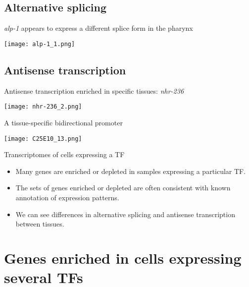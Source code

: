 \documentclass[serif,9pt]{beamer}
\begin{document}
\subsection{Alternative splicing}

\begin{frame}{{\em alp-1} appears to express a different splice form in the pharynx}
\begin{center}
\texttt{[image: alp-1\_1.png]}
\end{center} 
\end{frame}

\subsection{Antisense transcription}

\begin{frame}{Antisense transcription enriched in specific tissues: {\em nhr-236}}

\texttt{[image: nhr-236\_2.png]}

\end{frame}

\begin{frame}{A tissue-specific bidirectional promoter}

\texttt{[image: C25E10\_13.png]}

\end{frame}

\begin{frame}{Transcriptomes of cells expressing a TF}

\begin{itemize}

\item Many genes are enriched or depleted in samples expressing a
particular TF.

\item The sets of genes enriched or depleted are often consistent with
known annotation of expression patterns.

\item We can see differences in alternative splicing and antisense
transcription between tissues.

\end{itemize}

\end{frame}

\section{Genes enriched in cells expressing several TFs}
\end{document}
